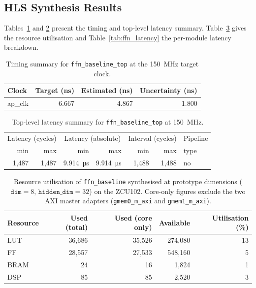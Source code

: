 \subsection{HLS Synthesis Results}
\label{subsec:ffn_csyn}

Tables~\ref{tab:ffn_timing} and \ref{tab:ffn_top_latency} present the
timing and top-level latency summary. Table~\ref{tab:ffn_resources} gives
the resource utilisation and Table~\ref{tab:ffn_latency} the per-module
latency breakdown.

\begin{table}[H]
  \centering
  \begin{tabular}{lrrr}
    \toprule
    Clock & Target (ns) & Estimated (ns) & Uncertainty (ns) \\
    \midrule
    ap\_clk & 6.667 & 4.867 & 1.800 \\
    \bottomrule
  \end{tabular}
  \caption{Timing summary for \texttt{ffn\_baseline\_top} at the
           \SI{150}{\mega\hertz} target clock.}
  \label{tab:ffn_timing}
\end{table}

\begin{table}[H]
  \centering
  \begin{tabular}{rrrrrrl}
    \toprule
    \multicolumn{2}{c}{Latency (cycles)} &
    \multicolumn{2}{c}{Latency (absolute)} &
    \multicolumn{2}{c}{Interval (cycles)} & Pipeline \\
    min & max & min & max & min & max & type \\
    \midrule
    1{,}487 & 1{,}487 & \SI{9.914}{\micro\second} & \SI{9.914}{\micro\second} & 1{,}488 & 1{,}488 & no \\
    \bottomrule
  \end{tabular}
  \caption{Top-level latency summary for \texttt{ffn\_baseline\_top} at
           \SI{150}{\mega\hertz}.}
  \label{tab:ffn_top_latency}
\end{table}

\begin{table}[H]
  \centering
  \begin{tabular}{lrrrr}
    \toprule
    Resource & Used (total) & Used (core only) & Available & Utilisation (\%) \\
    \midrule
    LUT  & 36{,}686 & 35{,}526 & 274{,}080 & 13 \\
    FF   & 28{,}557 & 27{,}533 & 548{,}160 &  5 \\
    BRAM &       24 &       16 &   1{,}824 &  1 \\
    DSP  &       85 &       85 &   2{,}520 &  3 \\
    \bottomrule
  \end{tabular}
  \caption{Resource utilisation of \texttt{ffn\_baseline} synthesised at
           prototype dimensions ($\texttt{dim} = 8$, $\texttt{hidden\_dim} = 32$)
           on the ZCU102. Core-only figures exclude the two AXI master
           adapters (\texttt{gmem0\_m\_axi} and \texttt{gmem1\_m\_axi}).}
  \label{tab:ffn_resources}
\end{table}


